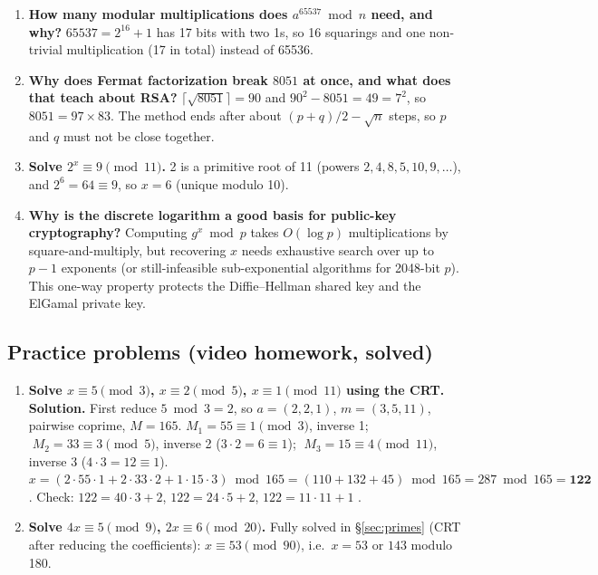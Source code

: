 \begin{enumerate}[leftmargin=1.5em]
  \item \textbf{How many modular multiplications does $a^{65537} \bmod n$ need, and why?} $65537 = 2^{16} + 1$ has 17 bits with two 1s, so 16 squarings and one non-trivial multiplication (17 in total) instead of 65536.
  \item \textbf{Why does Fermat factorization break $8051$ at once, and what does that teach about RSA?} $\lceil\sqrt{8051}\rceil = 90$ and $90^2 - 8051 = 49 = 7^2$, so $8051 = 97 \times 83$. The method ends after about $(p + q)/2 - \sqrt n$ steps, so $p$ and $q$ must not be close together.
  \item \textbf{Solve $2^x \equiv 9 \pmod{11}$.} 2 is a primitive root of 11 (powers $2, 4, 8, 5, 10, 9, \dots$), and $2^6 = 64 \equiv 9$, so $x = 6$ (unique modulo 10).
  \item \textbf{Why is the discrete logarithm a good basis for public-key cryptography?} Computing $g^x \bmod p$ takes $O(\log p)$ multiplications by square-and-multiply, but recovering $x$ needs exhaustive search over up to $p - 1$ exponents (or still-infeasible sub-exponential algorithms for 2048-bit $p$). This one-way property protects the Diffie--Hellman shared key and the ElGamal private key.
\end{enumerate}

\subsection*{Practice problems (video homework, solved)}
\begin{enumerate}[leftmargin=1.6em,itemsep=4pt]
  \item \textbf{Solve $x \equiv 5 \pmod 3$, $x \equiv 2 \pmod 5$, $x \equiv 1 \pmod{11}$ using the CRT.}\\
  \textbf{Solution.} First reduce $5 \bmod 3 = 2$, so $a = (2, 2, 1)$, $m = (3, 5, 11)$, pairwise coprime, $M = 165$.
  $M_1 = 55 \equiv 1 \pmod 3$, inverse 1; $\;M_2 = 33 \equiv 3 \pmod 5$, inverse 2 ($3 \cdot 2 = 6 \equiv 1$); $\;M_3 = 15 \equiv 4 \pmod{11}$, inverse 3 ($4 \cdot 3 = 12 \equiv 1$).
  $x = (2 \cdot 55 \cdot 1 + 2 \cdot 33 \cdot 2 + 1 \cdot 15 \cdot 3) \bmod 165 = (110 + 132 + 45) \bmod 165 = 287 \bmod 165 = \mathbf{122}$.
  Check: $122 = 40 \cdot 3 + 2$, $122 = 24 \cdot 5 + 2$, $122 = 11 \cdot 11 + 1$ \checkmark.
  \item \textbf{Solve $4x \equiv 5 \pmod 9$, $2x \equiv 6 \pmod{20}$.} Fully solved in \S\ref{sec:primes} (CRT after reducing the coefficients): $x \equiv 53 \pmod{90}$, i.e.\ $x = 53$ or $143$ modulo 180.
\end{enumerate}
